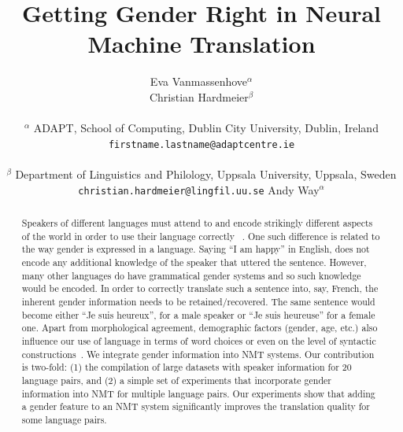 \newcommand\BibTeX{B{\sc ib}\TeX}
\newcommand\confname{EMNLP 2018}
\newcommand\conforg{SIGDAT}

\title{Getting Gender Right in Neural Machine Translation}


\author{Eva Vanmassenhove$^\alpha$\\
  \And
  Christian Hardmeier$^\beta$\\
  \\
   $^\alpha$ ADAPT, School of Computing,
  Dublin City University, Dublin, Ireland\\
  {\tt firstname.lastname@adaptcentre.ie} \\
  \\
   $^\beta$ Department of Linguistics and Philology, 
  Uppsala University, Uppsala, Sweden\\
  {\tt christian.hardmeier@lingfil.uu.se} \And
  Andy Way$^\alpha$\\
  }
\date{}


\maketitle
\begin{abstract}

Speakers of different languages must attend to and encode strikingly different aspects of the world in order to use their language correctly ~\cite{Sapir1921,Slobin1996}. One such difference is related to the way gender is expressed in a language. Saying ``I am happy'' in English, does not encode any additional knowledge of the speaker that uttered the sentence. However, many other languages do have grammatical gender systems and so such knowledge would be encoded. In order to correctly translate such a sentence into, say, French, the inherent gender information needs to be retained/recovered. The same sentence would become either ``Je suis heureux'', for a male speaker or ``Je suis heureuse'' for a female one. Apart from morphological agreement, demographic factors (gender, age, etc.) also influence our use of language in terms of word choices or even on the level of syntactic constructions~\cite{Tannen1991,Pennebaker2003}.
We integrate gender information into NMT systems. Our contribution is two-fold: (1) the compilation of large datasets with speaker information for 20 language pairs, and (2) a simple set of experiments that incorporate gender information into NMT for multiple language pairs. Our experiments show that adding a gender feature to an NMT system significantly improves the translation quality for some language pairs. 
\end{abstract}


